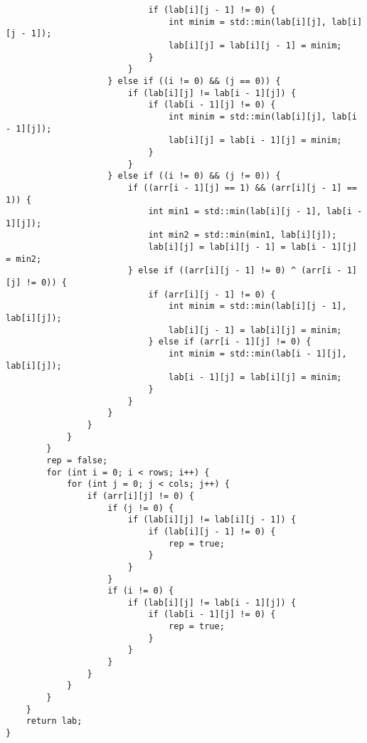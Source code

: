 \documentclass{report}
\begin{document}
\begin{lstlisting}
                            if (lab[i][j - 1] != 0) {
                                int minim = std::min(lab[i][j], lab[i][j - 1]);
                                lab[i][j] = lab[i][j - 1] = minim;
                            }
                        }
                    } else if ((i != 0) && (j == 0)) {
                        if (lab[i][j] != lab[i - 1][j]) {
                            if (lab[i - 1][j] != 0) {
                                int minim = std::min(lab[i][j], lab[i - 1][j]);
                                lab[i][j] = lab[i - 1][j] = minim;
                            }
                        }
                    } else if ((i != 0) && (j != 0)) {
                        if ((arr[i - 1][j] == 1) && (arr[i][j - 1] == 1)) {
                            int min1 = std::min(lab[i][j - 1], lab[i - 1][j]);
                            int min2 = std::min(min1, lab[i][j]);
                            lab[i][j] = lab[i][j - 1] = lab[i - 1][j] = min2;
                        } else if ((arr[i][j - 1] != 0) ^ (arr[i - 1][j] != 0)) {
                            if (arr[i][j - 1] != 0) {
                                int minim = std::min(lab[i][j - 1], lab[i][j]);
                                lab[i][j - 1] = lab[i][j] = minim;
                            } else if (arr[i - 1][j] != 0) {
                                int minim = std::min(lab[i - 1][j], lab[i][j]);
                                lab[i - 1][j] = lab[i][j] = minim;
                            }
                        }
                    }
                }
            }
        }
        rep = false;
        for (int i = 0; i < rows; i++) {
            for (int j = 0; j < cols; j++) {
                if (arr[i][j] != 0) {
                    if (j != 0) {
                        if (lab[i][j] != lab[i][j - 1]) {
                            if (lab[i][j - 1] != 0) {
                                rep = true;
                            }
                        }
                    }
                    if (i != 0) {
                        if (lab[i][j] != lab[i - 1][j]) {
                            if (lab[i - 1][j] != 0) {
                                rep = true;
                            }
                        }
                    }
                }
            }
        }
    }
    return lab;
}


\end{lstlisting}
\end{document}
